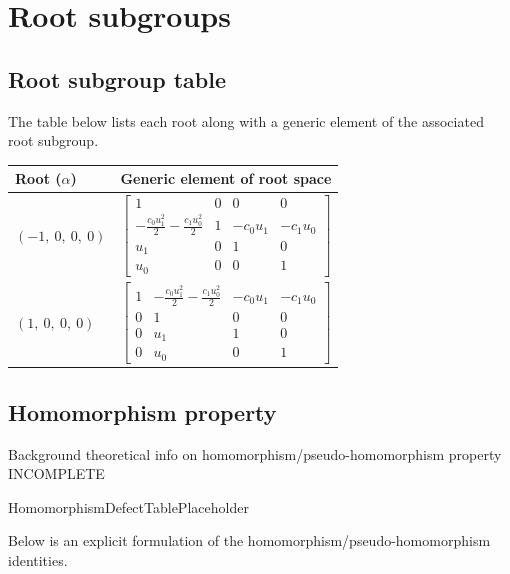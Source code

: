 \documentclass[11pt]{article}
\newcommand{\noi}{\noindent}
\theoremstyle{definition}
\begin{document}
\newpage
\section{Root subgroups}

\subsection{Root subgroup table}

\noi The table below lists each root along with a generic element of the associated root subgroup.

\bigskip

\noindent \begin{tabular}{|l|c|}
    \hline
    \textbf{Root ($\alpha$)} & \textbf{Generic element of root space} \\
    \hline
    $\left( -1, \  0, \  0, \  0\right)$ & $\left[\begin{matrix}1 & 0 & 0 & 0\\- \frac{c_{0} u_{1}^{2}}{2} - \frac{c_{1} u_{0}^{2}}{2} & 1 & - c_{0} u_{1} & - c_{1} u_{0}\\u_{1} & 0 & 1 & 0\\u_{0} & 0 & 0 & 1\end{matrix}\right]$ \\
    \hline
    $\left( 1, \  0, \  0, \  0\right)$ & $\left[\begin{matrix}1 & - \frac{c_{0} u_{1}^{2}}{2} - \frac{c_{1} u_{0}^{2}}{2} & - c_{0} u_{1} & - c_{1} u_{0}\\0 & 1 & 0 & 0\\0 & u_{1} & 1 & 0\\0 & u_{0} & 0 & 1\end{matrix}\right]$ \\
    \hline
\end{tabular}


\subsection{Homomorphism property}

\noi Background theoretical info on homomorphism/pseudo-homomorphism property INCOMPLETE

\bigskip

HomomorphismDefectTablePlaceholder

\noi Below is an explicit formulation of the homomorphism/pseudo-homomorphism identities.

\bigskip
\end{document}
